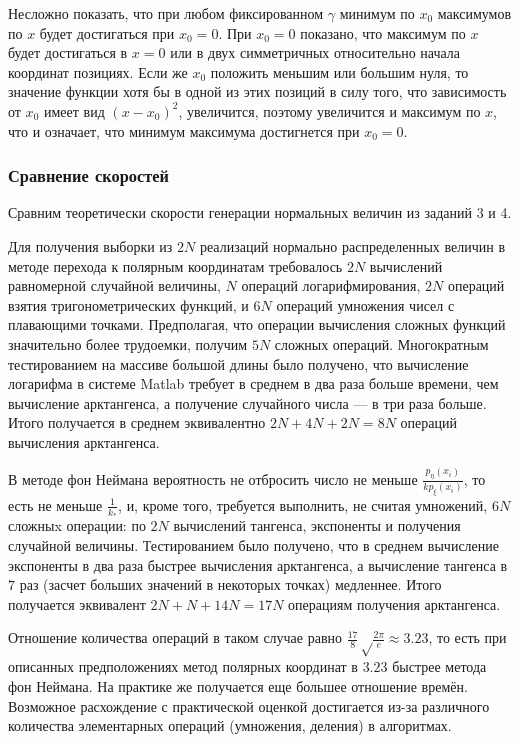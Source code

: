 \documentclass[12pt, a4paper]{article}
\begin{document}
Несложно показать, что при любом фиксированном $\gamma$ минимум по $x_0$ максимумов по $x$ будет достигаться при $x_0 = 0$. При $x_0 = 0$ показано, что максимум по $x$ будет достигаться в $x = 0$ или в двух симметричных относительно начала координат позициях. Если же $x_0$ положить меньшим или большим нуля, то значение функции хотя бы в одной из этих позиций в силу того, что зависимость от $x_0$ имеет вид $\left(x-x_0\right)^2$, увеличится, поэтому увеличится и максимум по $x$, что и означает, что минимум максимума достигнется при $x_0 = 0$.

\subsubsection{Сравнение скоростей}
Сравним теоретически скорости генерации нормальных величин из заданий 3 и 4.

Для получения выборки из $2N$ реализаций нормально распределенных величин в методе перехода к полярным координатам требовалось $2N$ вычислений равномерной случайной величины, $N$ операций логарифмирования, $2N$ операций взятия тригонометрических функций, и $6N$ операций умножения чисел с плавающими точками. Предполагая, что операции вычисления сложных функций значительно более трудоемки, получим $5N$ сложных операций. Многократным тестированием на массиве большой длины было получено, что вычисление логарифма в системе Matlab требует в среднем в два раза больше времени, чем вычисление арктангенса, а получение случайного числа --- в три раза больше. Итого получается в среднем эквивалентно $2N+4N+2N=8N$ операций вычисления арктангенса.

В методе фон Неймана вероятность не отбросить число не меньше $\frac{p_\eta(x_i)}{k p_\xi(x_i)}$, то есть не меньше $\frac{1}{k_*}$, и, кроме того, требуется выполнить, не считая умножений, $6N$ сложныx операции: по $2N$ вычислений тангенса, экспоненты и получения случайной величины. Тестированием было получено, что в среднем вычисление экспоненты в два раза быстрее вычисления арктангенса, а вычисление тангенса в $7$ раз (засчет больших значений в некоторых точках) медленнее. Итого получается эквивалент $2N+N+14N = 17N$ операциям получения арктангенса.

Отношение количества операций в таком случае равно $\frac {17}8 \sqrt\frac{2\pi}e \approx 3.23$, то есть при описанных предположениях метод полярных координат в $3.23$ быстрее метода фон Неймана. На практике же получается еще большее отношение времён. Возможное расхождение с практической оценкой достигается из-за различного количества элементарных операций (умножения, деления) в алгоритмах.
\end{document}
